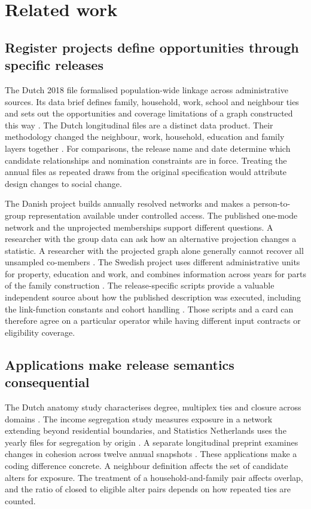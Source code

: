 \section{Related work}\label{sec:related}

\subsection{Register projects define opportunities through specific releases}

The Dutch 2018 file formalised population-wide linkage across administrative sources. Its data brief defines family, household, work, school and neighbour ties and sets out the opportunities and coverage limitations of a graph constructed this way \citep{vanderlaan2022,vanderlaan2023}. The Dutch longitudinal files are a distinct data product. Their methodology changed the neighbour, work, household, education and family layers together \citep{cbs2023,das2023}. For comparisons, the release name and date determine which candidate relationships and nomination constraints are in force. Treating the annual files as repeated draws from the original specification would attribute design changes to social change.

The Danish project builds annually resolved networks and makes a person-to-group representation available under controlled access. The published one-mode network and the unprojected memberships support different questions. A researcher with the group data can ask how an alternative projection changes a statistic. A researcher with the projected graph alone generally cannot recover all unsampled co-members \citep{cremers2025}. The Swedish project uses different administrative units for property, education and work, and combines information across years for parts of the family construction \citep{panayiotou2025,wohlert2024}. The release-specific scripts provide a valuable independent source about how the published description was executed, including the link-function constants and cohort handling \citep{secode2026}. Those scripts and a card can therefore agree on a particular operator while having different input contracts or eligibility coverage.

\subsection{Applications make release semantics consequential}

The Dutch anatomy study characterises degree, multiplex ties and closure across domains \citep{bokanyi2023}. The income segregation study measures exposure in a network extending beyond residential boundaries, and Statistics Netherlands uses the yearly files for segregation by origin \citep{kazmina2024,vanklingeren2024}. A separate longitudinal preprint examines changes in cohesion across twelve annual snapshots \citep{bokanyi2026}. These applications make a coding difference concrete. A neighbour definition affects the set of candidate alters for exposure. The treatment of a household-and-family pair affects overlap, and the ratio of closed to eligible alter pairs depends on how repeated ties are counted.

